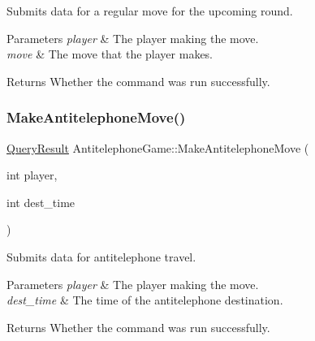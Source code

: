 Submits data for a regular move for the upcoming round. 


\begin{DoxyParams}{Parameters}
{\em player} & The player making the move. \\
\hline
{\em move} & The move that the player makes. \\
\hline
\end{DoxyParams}
\begin{DoxyReturn}{Returns}
Whether the command was run successfully. 
\end{DoxyReturn}
\mbox{\label{class_antitelephone_game_a1f2c5e5679d20d1090b247f4229ac0ff}} 
\subsubsection{\texorpdfstring{Make\+Antitelephone\+Move()}{MakeAntitelephoneMove()}}
{\footnotesize\ttfamily \hyperlink{class_query_result}{Query\+Result} Antitelephone\+Game\+::\+Make\+Antitelephone\+Move (\begin{DoxyParamCaption}\item[{int}]{player,  }\item[{int}]{dest\+\_\+time }\end{DoxyParamCaption})}



Submits data for antitelephone travel. 


\begin{DoxyParams}{Parameters}
{\em player} & The player making the move. \\
\hline
{\em dest\+\_\+time} & The time of the antitelephone destination. \\
\hline
\end{DoxyParams}
\begin{DoxyReturn}{Returns}
Whether the command was run successfully. 
\end{DoxyReturn}
\mbox{\label{class_antitelephone_game_ae9c8eb5708660ae72b3fc1042bff4737}} 
